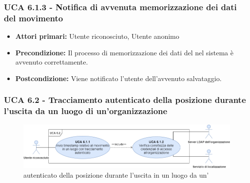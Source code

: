 \subsubsection{UCA 6.1.3 - Notifica di avvenuta memorizzazione dei dati del movimento}
\begin{itemize}
	\item \textbf{Attori primari:} Utente riconosciuto, Utente anonimo
	\item \textbf{Precondizione:} Il processo di memorizzazione dei dati del  nel sistema è avvenuto correttamente.
	\item \textbf{Postcondizione:} Viene notificato l'utente dell'avvenuto salvataggio.
\end{itemize}


\subsubsection{UCA 6.2 - Tracciamento autenticato della posizione durante l'uscita da un luogo di un'organizzazione}

\begin{figure}[h]
	\centering
	\includegraphics[scale=0.4, center]{Sezioni/UseCase/Immagini/UCA6.2.png}
	\caption{ autenticato della posizione durante l'uscita in un luogo da un'}
\end{figure} 

